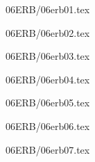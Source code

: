 \documentclass[9pt, xcolor={svgnames, x11names},professionalfonts]{beamer}
\def\scale{1}
\begin{document}

\begin{frame}{06ERB/06erb01.tex}	
	\def\scale{0.55}
	\tcb{
		\centering
		
	}
\end{frame}


\begin{frame}{06ERB/06erb02.tex}
		\def\scale{0.55}
		\tcb{
			
		}	
\end{frame}


\begin{frame}{06ERB/06erb03.tex}	
	\def\scale{0.55}
	\tcb{
		\centering
		
	}
\end{frame}


\begin{frame}{06ERB/06erb04.tex}
	\def\scale{0.75}
	\tcb{
		\centering
		
	}			
\end{frame}


\begin{frame}{06ERB/06erb05.tex}
	\def\scale{0.675}
	\tcb{
		\centering
		
	}			
\end{frame}


\begin{frame}{06ERB/06erb06.tex}	
		\def\scale{1}
		\tcb{
			
		}		
\end{frame}


\begin{frame}{06ERB/06erb07.tex}	
		\def\scale{0.65}
		\tcb{
			
		}		
\end{frame}

\end{document}
